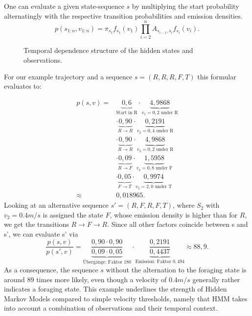 One can evaluate a given state-sequence $s$ by multiplying the start probability alternatingly with the respective transition probabilities and emission densities.
\[
        p(s_{1:n},v_{1:n})
        =
        \pi_{s_1}f_{s_1}(v_1)
        \prod_{i=2}^{n}
        A_{s_{i-1},s_i}f_{s_i}(v_i).
\]

\begin{figure}[htbp]
    \centering
    \caption{Temporal dependence structure of the hidden states and observations.}
    \label{fig:hmm-temporal-structure}
\end{figure}


For our example trajectory and a sequence $s=(R,R,R,F,T)$ this formular evaluates to:

\[
\begin{aligned}
p(s,v)
={}&
\underbrace{0{,}6}_{\text{Start in R}}
\cdot
\underbrace{4{,}9868}_{v_1=0{,}2\text{ under R}}\\
&\cdot
\underbrace{0{,}90}_{R\rightarrow R}
\cdot
\underbrace{0{,}2191}_{v_2=0{,}4\text{ under R}}\\
&\cdot
\underbrace{0{,}90}_{R\rightarrow R}
\cdot
\underbrace{4{,}9868}_{v_3=0{,}2\text{ under R}}\\
&\cdot
\underbrace{0{,}09}_{R\rightarrow F}
\cdot
\underbrace{1{,}5958}_{v_4=0{,}8\text{ under F}}\\
&\cdot
\underbrace{0{,}05}_{F\rightarrow T}
\cdot
\underbrace{0{,}9974}_{v_5=2{,}0\text{ under T}}\\
\approx{}&0{,}018965.
\end{aligned}
\]
Looking at an alternative sequence \(
s'=(R,F,R,F,T)
\), where $S_2$ with $v_2 = 0.4 m/s$ is assigned the state $F$, whose emission density is higher than for $R$, we get the transitions  \(R\rightarrow F\rightarrow R\).
Since all other factors coincide between s and s', we can evaluate s' via
\[
\frac{p(s,v)}{p(s',v)}
=
\underbrace{\frac{0{,}90\cdot0{,}90}
{0{,}09\cdot0{,}05}}_{\text{Übergänge: Faktor }180}
\cdot
\underbrace{\frac{0{,}2191}{0{,}4437}}_{\text{Emission: Faktor }0{,}494}
\approx88{,}9.
\]
As a consequence, the sequence $s$ without the alternation to the foraging state is around 89 times more likely, even though a velocity of $0.4 m/s$ generally rather indicates a foraging state.
This example underlines the strength of Hidden Markov Models compared to simple velocity thresholds, namely that HMM takes into account a combination of observations and their temporal context.

